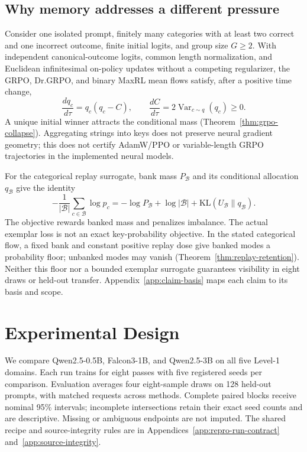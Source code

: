 \documentclass{article}
\newcommand{\1}{\mathbf 1}
\theoremstyle{remark}
\theoremstyle{definition}
\theoremstyle{plain}
\begin{document}
\subsection{Why memory addresses a different pressure}
\label{sec:collapse-mechanism}

Consider one isolated prompt, finitely many categories with at least two
correct and one incorrect outcome, finite initial logits, and group size
$G\ge2$. With independent canonical-outcome logits, common length
normalization, and Euclidean infinitesimal on-policy updates without a
competing regularizer, the GRPO, Dr.GRPO, and binary MaxRL mean flows satisfy,
after a positive time change,
\begin{equation}
 \frac{dq_c}{d\tau}=q_c(q_c-C),\qquad
 \frac{dC}{d\tau}=2\operatorname{Var}_{c\sim q}(q_c)\ge0.
 \label{eq:main-collapse-flow}
\end{equation}
A unique initial winner attracts the conditional mass
(Theorem~\ref{thm:grpo-collapse}). Aggregating strings into keys does not
preserve neural gradient geometry; this does not certify AdamW/PPO or
variable-length GRPO trajectories in the implemented neural models.

For the categorical replay surrogate, bank mass $P_{\mathcal B}$ and its
conditional allocation $q_{\mathcal B}$ give the identity
\begin{equation}
 -\frac1{|\mathcal B|}\sum_{c\in\mathcal B}\log p_c
 =-\log P_{\mathcal B}+\log|\mathcal B|
 +\mathrm{KL}(U_{\mathcal B}\|q_{\mathcal B}).
 \label{eq:main-bank-decomposition}
\end{equation}
The objective rewards banked mass and penalizes imbalance. The actual
exemplar loss is not an exact key-probability objective. In the stated
categorical flow, a fixed bank and constant positive replay dose give banked
modes a probability floor; unbanked modes may vanish
(Theorem~\ref{thm:replay-retention}). Neither this floor nor a bounded
exemplar surrogate guarantees visibility in eight draws or held-out transfer.
Appendix~\ref{app:claim-basis} maps each claim to its basis and scope.

\section{Experimental Design}
\label{sec:experiments}
\label{sec:shared-protocol}

We compare Qwen2.5-0.5B, Falcon3-1B, and Qwen2.5-3B on all five Level-1 domains.
Each run trains for eight passes with five registered seeds per comparison.
Evaluation averages four eight-sample draws on 128 held-out prompts, with
matched requests across methods. Complete paired blocks receive nominal
95\% intervals; incomplete intersections retain their exact seed counts and
are descriptive. Missing or ambiguous endpoints are not imputed. The shared
recipe and source-integrity rules are in
Appendices~\ref{app:repro-run-contract} and~\ref{app:source-integrity}.
\end{document}
